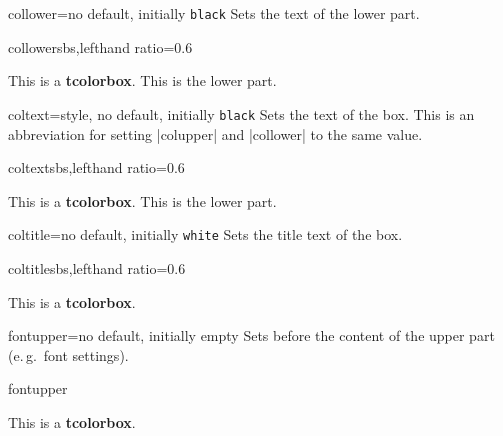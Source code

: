 \begin{docTcbKey}{collower}{=}{no default, initially \texttt{black}}
  Sets the text  of the lower part.
\begin{exdispExample*}{collower}{sbs,lefthand ratio=0.6}
\begin{tcolorbox}[collower=red!75!black]
This is a \textbf{tcolorbox}.
\tcblower
This is the lower part.
\end{tcolorbox}
\end{exdispExample*}
\end{docTcbKey}


\begin{docTcbKey}{coltext}{=}{style, no default, initially \texttt{black}}
  Sets the text  of the box. This is an abbreviation for setting
  |colupper| and |collower| to the same value.
\begin{exdispExample*}{coltext}{sbs,lefthand ratio=0.6}
\begin{tcolorbox}[coltext=red!75!black]
This is a \textbf{tcolorbox}.
\tcblower
This is the lower part.
\end{tcolorbox}
\end{exdispExample*}
\end{docTcbKey}


\begin{docTcbKey}{coltitle}{=}{no default, initially \texttt{white}}
  Sets the title text  of the box.
\begin{exdispExample*}{coltitle}{sbs,lefthand ratio=0.6}
\begin{tcolorbox}[coltitle=red!75!black,
  colbacktitle=black!10!white,title=Test]
This is a \textbf{tcolorbox}.
\end{tcolorbox}
\end{exdispExample*}
\end{docTcbKey}

\clearpage

\begin{docTcbKey}{fontupper}{=}{no default, initially empty}
  Sets  before the content of the upper part (e.\,g.\ font settings).
\begin{exdispExample}{fontupper}
\begin{tcolorbox}[fontupper=Hello!~\sffamily]
This is a \textbf{tcolorbox}.
\end{tcolorbox}
\end{exdispExample}
\end{docTcbKey}


